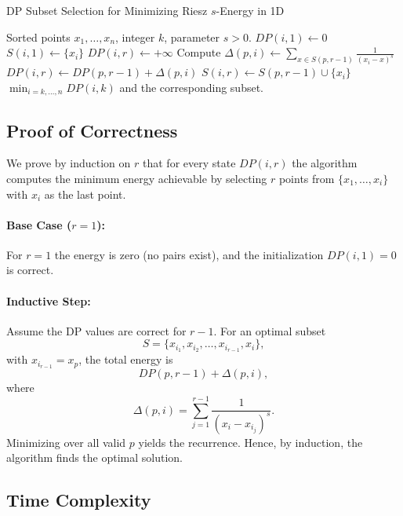 \documentclass[11pt]{article}
\begin{document}
\begin{algorithm}[H]
\caption{DP Subset Selection for Minimizing Riesz \(s\)-Energy in 1D}\label{alg:dp1d}
\begin{algorithmic}[1]
\Require Sorted points \(x_1,\dots,x_n\), integer \(k\), parameter \(s>0\).
    \State \(DP(i,1) \gets 0\)
    \State \(S(i,1) \gets \{ x_i \}\) 
\EndFor
{}
        \State \(DP(i,r) \gets +\infty\)
            \State Compute \(\Delta(p,i) \gets \sum_{x\in S(p,r-1)} \frac{1}{(x_i - x)^s}\)
                \State \(DP(i,r) \gets DP(p,r-1)+\Delta(p,i)\)
                \State \(S(i,r) \gets S(p,r-1) \cup \{ x_i \}\)
            \EndIf
        \EndFor
    \EndFor
\EndFor
\State \Return \(\min_{i=k,\dots,n} DP(i,k)\) and the corresponding subset.
\end{algorithmic}
\end{algorithm}

\subsection{Proof of Correctness}

We prove by induction on \(r\) that for every state \(DP(i,r)\) the algorithm computes the minimum energy achievable by selecting \(r\) points from \(\{x_1,\dots,x_i\}\) with \(x_i\) as the last point.

\paragraph{Base Case (\(r=1\)):}  
For \(r=1\) the energy is zero (no pairs exist), and the initialization \(DP(i,1)=0\) is correct.

\paragraph{Inductive Step:}  
Assume the DP values are correct for \(r-1\). For an optimal subset 
\[
S = \{x_{i_1}, x_{i_2}, \dots, x_{i_{r-1}}, x_i\},
\]
with \(x_{i_{r-1}}=x_p\), the total energy is
\[
DP(p, r-1) + \Delta(p,i),
\]
where
\[
\Delta(p,i)=\sum_{j=1}^{r-1}\frac{1}{\left(x_i - x_{i_j}\right)^s}.
\]
Minimizing over all valid \(p\) yields the recurrence. Hence, by induction, the algorithm finds the optimal solution.

\subsection{Time Complexity}
\end{document}
